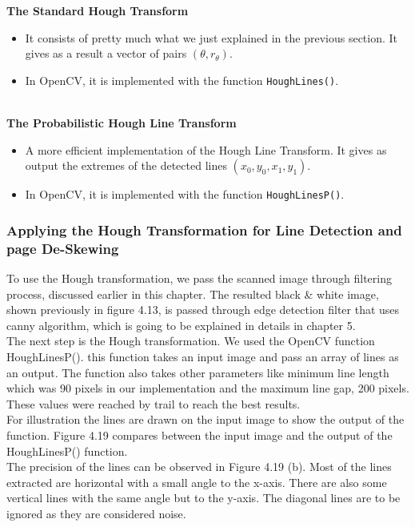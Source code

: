 \textbf{The Standard Hough Transform}
\begin{itemize}
    \item It consists of pretty much what we just explained in the previous section. It gives as a result a vector of pairs \((\theta, r_\theta)\).
    \item In OpenCV, it is implemented with the function \texttt{HoughLines()}.
\end{itemize}\\

\textbf{The Probabilistic Hough Line Transform}
\begin{itemize}
    \item A more efficient implementation of the Hough Line Transform. It gives as output the extremes of the detected lines \((x_0, y_0, x_1, y_1)\).
    \item In OpenCV, it is implemented with the function \texttt{HoughLinesP()}.
\end{itemize}

\subsubsection{Applying the Hough Transformation for Line Detection and page De-Skewing}
\quad To use the Hough transformation, we pass the scanned image through filtering process, discussed earlier in this chapter. The resulted black \& white image, shown previously in figure 4.13, is passed through edge detection filter that uses canny algorithm, which is going to be explained in details in chapter 5.  \\
\quad The next step is the Hough transformation. We used the OpenCV function HoughLinesP(). this function takes an input image and pass an array of lines as an output. The function also takes other parameters like minimum line length which was 90 pixels in our implementation and the maximum line gap, 200 pixels. These values were reached by trail to reach the best results.\\

\quad For illustration the lines are drawn on the input image to show the output of the function. Figure 4.19 compares between the input image and the output of the HoughLinesP() function. \\

The precision of the lines can be observed in Figure 4.19 (b). Most of the lines extracted are horizontal with a small angle to the x-axis. There are also some vertical lines with the same angle but to the y-axis. The diagonal lines are to be ignored as they are considered noise. \\

